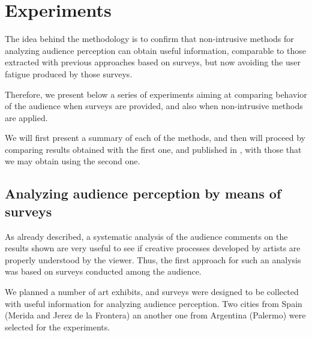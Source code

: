 \documentclass[graybox]{svmult}
\begin{document}
\section{Experiments}
\label{experiments}
The idea behind the methodology is to confirm that non-intrusive methods for analyzing audience perception can obtain useful information, comparable to those extracted with previous approaches based on surveys, but now avoiding the user fatigue produced by those surveys.

Therefore, we present below a series of experiments aiming at comparing behavior of the audience when surveys are provided, and also when non-intrusive methods are applied.  

We will first present a summary of each of the methods, and then will proceed by comparing results obtained with the first one, and published in \cite{moreno2016analysing}, with those that we may obtain using the second one. 

\subsection{Analyzing audience perception by means of surveys}

As already described, a systematic analysis of the audience comments on the results shown are very useful to see if creative processes developed by artists are properly understood by the viewer.  Thus, the first approach for such an analysis was based on surveys conducted among the audience.

We planned a number of art exhibits, and surveys were designed to be collected with useful information for analyzing audience perception.  %
Two cities from Spain (Merida and Jerez de la Frontera) an another one from Argentina (Palermo) were selected for the experiments.
\end{document}
